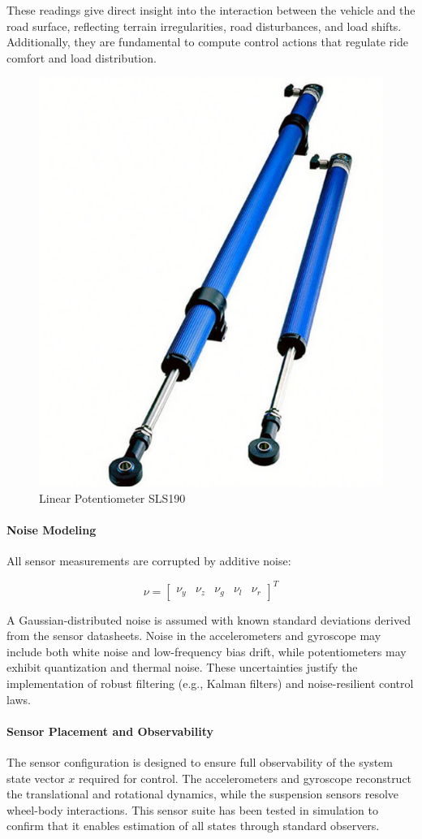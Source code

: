 \documentclass[]{report}
\begin{document}
	These readings give direct insight into the interaction between the vehicle and the road surface, reflecting terrain irregularities, road disturbances, and load shifts. Additionally, they are fundamental to compute control actions that regulate ride comfort and load distribution.
	\begin{figure}[h]
		\centering
		\includegraphics[width=0.3\linewidth]{img/LIS3DH2}
		\caption{Linear Potentiometer SLS190}
		\label{fig:lis3dh2}
	\end{figure}
	\newpage
	\paragraph{Noise Modeling}
	All sensor measurements are corrupted by additive noise:
	
	\[
	\nu = \begin{bmatrix}
		\nu_y & \nu_z & \nu_g & \nu_l & \nu_r
	\end{bmatrix}^T
	\]
	
	A Gaussian-distributed noise is assumed with known standard deviations derived from the sensor datasheets. Noise in the accelerometers and gyroscope may include both white noise and low-frequency bias drift, while potentiometers may exhibit quantization and thermal noise. These uncertainties justify the implementation of robust filtering (e.g., Kalman filters) and noise-resilient control laws.
	
	\paragraph{Sensor Placement and Observability}
	The sensor configuration is designed to ensure full observability of the system state vector $x$ required for control. The accelerometers and gyroscope reconstruct the translational and rotational dynamics, while the suspension sensors resolve wheel-body interactions. This sensor suite has been tested in simulation to confirm that it enables estimation of all states through standard observers.
	
\end{document}

